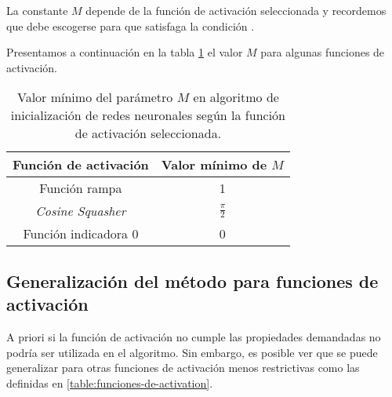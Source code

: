 La  constante $M$ depende de la función de activación seleccionada y recordemos que  debe escogerse para que satisfaga la condición . 

Presentamos a continuación en la tabla \ref{table:M-activation-function} el valor $M$ para algunas funciones de activación. 

\begin{table}[H]
    \centering
    \begin{tabular}{|c|c|}
    \hline
        Función de activación  & Valor mínimo de $M$ \\ \hline
        Función rampa & 1 \\ \hline
        \textit{Cosine Squasher} & $\frac{\pi}{2}$ \\ \hline
        Función indicadora 0 & 0 \\ \hline
    \end{tabular}
    \caption{Valor mínimo del parámetro $M$ en algoritmo de inicialización de redes neuronales según la función de activación seleccionada.}
    \label{table:M-activation-function}
\end{table}

\subsection{Generalización del método para funciones de activación }

A priori si  la función de activación no cumple las propiedades 
demandadas no podría ser utilizada en el algoritmo.  Sin embargo, es 
posible ver que se puede generalizar para otras
funciones de activación menos restrictivas como las definidas en \ref{table:funciones-de-activation}. 

